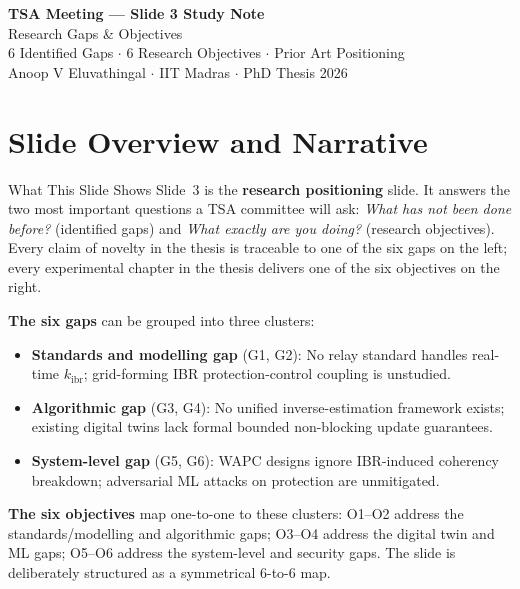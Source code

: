 \documentclass[12pt,a4paper]{article}
\newcommand{\kibr}{k_\mathrm{ibr}}
\begin{document}
\begin{tcolorbox}[colback=iitmnavy,coltext=white,arc=4pt,boxrule=0pt]
\begin{center}
  {\Large\bfseries TSA Meeting --- Slide 3 Study Note}\\[4pt]
  {\large Research Gaps \& Objectives}\\[6pt]
  {\normalsize 6 Identified Gaps $\cdot$ 6 Research Objectives $\cdot$ Prior Art Positioning}\\[2pt]
  {\small Anoop V Eluvathingal $\cdot$ IIT Madras $\cdot$ PhD Thesis 2026}
\end{center}
\end{tcolorbox}

\vspace{6pt}

\section{Slide Overview and Narrative}

\begin{keybox}{What This Slide Shows}
Slide~3 is the \textbf{research positioning} slide.  It answers the two most
important questions a TSA committee will ask: \emph{What has not been done
before?} (identified gaps) and \emph{What exactly are you doing?} (research
objectives).  Every claim of novelty in the thesis is traceable to one of
the six gaps on the left; every experimental chapter in the thesis delivers
one of the six objectives on the right.

\medskip
\textbf{The six gaps} can be grouped into three clusters:
\begin{itemize}[nosep]
  \item \textbf{Standards and modelling gap} (G1, G2):
        No relay standard handles real-time $\kibr$; grid-forming IBR
        protection-control coupling is unstudied.
  \item \textbf{Algorithmic gap} (G3, G4):
        No unified inverse-estimation framework exists; existing digital
        twins lack formal bounded non-blocking update guarantees.
  \item \textbf{System-level gap} (G5, G6):
        WAPC designs ignore IBR-induced coherency breakdown; adversarial
        ML attacks on protection are unmitigated.
\end{itemize}

\textbf{The six objectives} map one-to-one to these clusters:
O1--O2 address the standards/modelling and algorithmic gaps;
O3--O4 address the digital twin and ML gaps; O5--O6 address the
system-level and security gaps.  The slide is deliberately structured
as a symmetrical 6-to-6 map.
\end{keybox}
\end{document}
